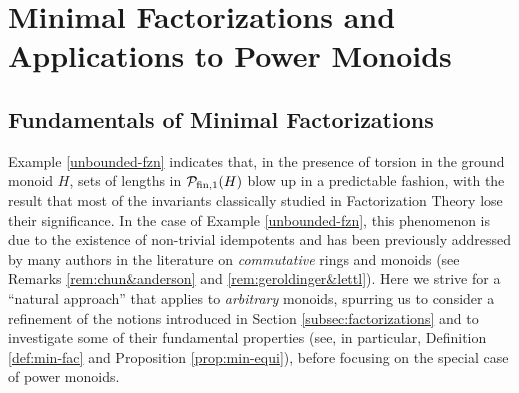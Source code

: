 \chapter{Minimal Factorizations and Applications to Power Monoids} \label{ch:minimal factorizations}
\section{Fundamentals of Minimal Factorizations}
\label{sec:minimal-factorizations}
%
	
%
Example \ref{unbounded-fzn} indicates that, in the presence of torsion in the ground monoid $H$, sets of lengths in $\mathcal{P}_{\textrm{fin}, 1}(H)$ blow up in a predictable fashion, with the result that most of the invariants classically studied in Factorization Theory lose their significance. 
In the case of Example \ref{unbounded-fzn}, this phenomenon is due to the existence of non-trivial idempotents and has been previously addressed by many authors in the literature on \emph{commutative} rings and monoids (see Remarks \ref{rem:chun&anderson} and \ref{rem:geroldinger&lettl}).
Here we strive for a ``natural approach'' that applies to \emph{arbitrary} monoids, spurring us to consider a refinement of the notions introduced in Section \ref{subsec:factorizations} and to investigate some of their fundamental properties (see, in particular, Definition \ref{def:min-fac} and Proposition \ref{prop:min-equi}), before focusing on the special case of power monoids.

